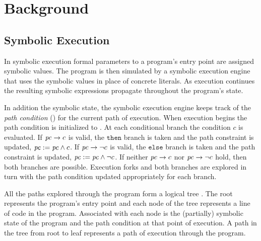 \section{Background}
\subsection{Symbolic Execution}
In symbolic execution formal parameters to a program's entry point are
assigned symbolic values. The program is then simulated by a symbolic execution
engine that uses the symbolic values in place of concrete literals. As
execution continues the resulting symbolic expressions propagate throughout the program's
state.

In addition the symbolic state, the symbolic execution engine keeps track
of the \emph{path condition} (\pathcondition) for the current path of execution. When execution begins the path condition is initialized
to \texttrue. At each conditional branch the condition $c$ is evaluated. If $\mathit{pc}
\rightarrow c$ is valid, the $\mathtt{then}$ branch is taken and the path constraint is
updated, $\mathit{pc} := \mathit{pc} \wedge c$. If $\mathit{pc} \rightarrow \neg c$ is valid, the $\mathtt{else}$
branch is taken and the path constraint is updated, $\mathit{pc} := \mathit{pc} \wedge \neg
c$. If neither $\mathit{pc} \rightarrow c$ nor $\mathit{pc} \rightarrow \neg c$ hold, then both
branches are possible. Execution forks and both branches are explored in turn
with the path condition updated appropriately for each branch.

All the paths explored through the program form a logical tree \tree. The root represents the
program's entry point and each node of the
tree represents a line of code in the program. Associated with each node is the
(partially) symbolic state of the program and the path condition at that point
of execution. A path in the tree from root to leaf
represents a path of execution through the program.


